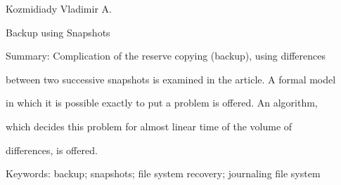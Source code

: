 Kozmidiady Vladimir A.





Backup using Snapshots





Summary: Complication of the reserve copying (backup), using differences


between two successive snapshots is examined in the article. A formal model


in which it is possible exactly to put a problem is offered. An algorithm,


which decides this problem for almost linear time of the volume of


differences, is offered.





Keywords: backup; snapshots; file system recovery; journaling file system


